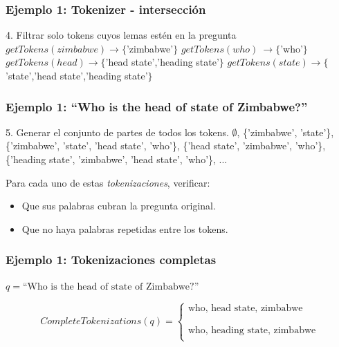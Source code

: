 \begin{frame}[t]
\frametitle{Ejemplo 1: Tokenizer - intersección}
4. Filtrar solo tokens cuyos lemas estén en la pregunta\newline
  \Large{
    $getTokens(zimbabwe) \rightarrow \{$'zimbabwe'$\}$\newline
    $getTokens(who)\ \rightarrow \{$'who'$\}$\newline
    $getTokens(head) \rightarrow \{$'head state','heading state'$\}$\newline
    $getTokens(state) \rightarrow  \{$'state','head state','heading state'$\}$
}
\end{frame}

\begin{frame}[t]
\frametitle{Ejemplo 1: ``Who is the head of state of Zimbabwe?''}
 5. Generar el conjunto de partes de todos los tokens.\newline
  \Large{
      $\emptyset$,\newline
      \{'zimbabwe', 'state'\},\newline
      \{'zimbabwe', '{\color{red}state}', 'head {\color{red}state}', 'who'\},\newline
      \{'head state', 'zimbabwe', 'who'\},\newline
      \{'{\color{red}heading state}', 'zimbabwe', '{\color{red}head state}', 'who'\},\newline
      ...
  }\newline

  \normalsize{Para cada uno de estas \textit{tokenizaciones}, verificar:
  \begin{itemize}
    \item Que sus palabras cubran la pregunta original.
    \item Que no haya palabras repetidas entre los tokens.
  \end{itemize}
  }
\end{frame}

\begin{frame}
\frametitle{Ejemplo 1: Tokenizaciones completas}

\begin{center}

$q = \text{``Who is the head of state of Zimbabwe?''}$
\end{center}
 \begin{equation*}
    CompleteTokenizations(q) = \begin{cases}
               \text{who, head state, zimbabwe} \\
               \\
               \\
               \text{who, heading state, zimbabwe} \\
           \end{cases}
\end{equation*}

\end{frame}

